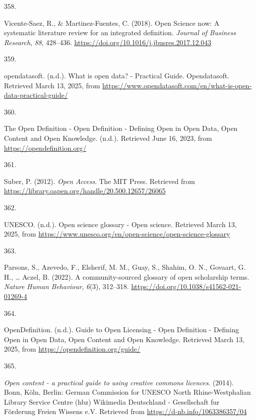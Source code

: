 \documentclass[
  11pt,
  letterpaper,
]{scrreprt}
\newlength{\cslhangindent}
\newlength{\csllabelwidth}
\newenvironment{CSLReferences}[2] %
 {\begin{list}{}{%
  \setlength{\itemindent}{0pt}
  \setlength{\leftmargin}{0pt}
  \setlength{\parsep}{0pt}
  \ifodd #1
   \setlength{\leftmargin}{\cslhangindent}
   \setlength{\itemindent}{-1\cslhangindent}
  \fi
  \setlength{\itemsep}{#2\baselineskip}}}
 {\end{list}}
\newcommand{\CSLLeftMargin}[1]{\parbox[t]{\csllabelwidth}{\strut#1\strut}}
\newcommand{\CSLRightInline}[1]{\parbox[t]{\linewidth - \csllabelwidth}{\strut#1\strut}}
\begin{document}
\begin{CSLReferences}{0}{0}
\CSLLeftMargin{358. }%
\CSLRightInline{Vicente-Saez, R., \& Martinez-Fuentes, C. (2018). Open
{Science} now: {A} systematic literature review for an integrated
definition. \emph{Journal of Business Research}, \emph{88}, 428--436.
\url{https://doi.org/10.1016/j.jbusres.2017.12.043}}

\CSLLeftMargin{359. }%
\CSLRightInline{opendatasoft. (n.d.). What is open data? - {Practical
Guide}. Opendatasoft. Retrieved March 13, 2025, from
\url{https://www.opendatasoft.com/en/what-is-open-data-practical-guide/}}

\CSLLeftMargin{360. }%
\CSLRightInline{The {Open Definition} - {Open Definition} - {Defining
Open} in {Open Data}, {Open Content} and {Open Knowledge}. (n.d.).
Retrieved June 16, 2023, from \url{https://opendefinition.org/}}

\CSLLeftMargin{361. }%
\CSLRightInline{Suber, P. (2012). \emph{Open {Access}}. The MIT Press.
Retrieved from
\url{https://library.oapen.org/handle/20.500.12657/26065}}

\CSLLeftMargin{362. }%
\CSLRightInline{UNESCO. (n.d.). Open science glossary - {Open} science.
Retrieved March 13, 2025, from
\url{https://www.unesco.org/en/open-science/open-science-glossary}}

\CSLLeftMargin{363. }%
\CSLRightInline{Parsons, S., Azevedo, F., Elsherif, M. M., Guay, S.,
Shahim, O. N., Govaart, G. H., \ldots{} Aczel, B. (2022). A
community-sourced glossary of open scholarship terms. \emph{Nature Human
Behaviour}, \emph{6}(3), 312--318.
\url{https://doi.org/10.1038/s41562-021-01269-4}}

\CSLLeftMargin{364. }%
\CSLRightInline{OpenDefinition. (n.d.). Guide to {Open Licensing} -
{Open Definition} - {Defining Open} in {Open Data}, {Open Content} and
{Open Knowledge}. Retrieved March 13, 2025, from
\url{https://opendefinition.org/guide/}}

\CSLLeftMargin{365. }%
\CSLRightInline{\emph{Open content - a practical guide to using creative
commons licences}. (2014). Bonn, Köln, Berlin: German Commission for
UNESCO North Rhine-Westphalian Library Service Centre (hbz) Wikimedia
Deutschland - Gesellschaft fur Förderung Freien Wissens e.V. Retrieved
from \url{https://d-nb.info/1063386357/04}}


\end{CSLReferences}
\end{document}
